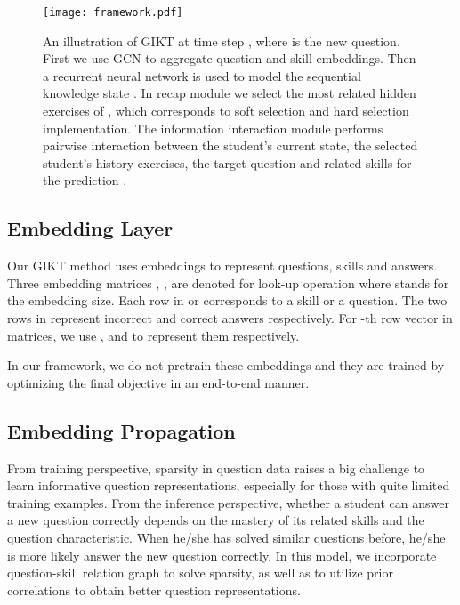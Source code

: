 \documentclass[runningheads]{llncs}
\begin{document}
\begin{figure}
	\texttt{[image: framework.pdf]}
	\caption{An illustration of GIKT at time step , where  is the new question. First we use GCN to aggregate question and skill embeddings. Then a recurrent neural network is used to model the sequential knowledge state . In recap module we select the most related hidden exercises of , which corresponds to soft selection and hard selection implementation. The information interaction module performs pairwise interaction between the student’s current state, the selected student’s history 
		exercises, the target question and related skills for the prediction .} \label{framework}
	\label{fig:framework}
\end{figure}

\subsection{Embedding Layer}

Our GIKT method uses embeddings to represent questions, skills and answers. Three embedding matrices , ,
 are denoted for look-up operation where  stands for the embedding size. Each row in  or   corresponds to a skill or a question. The two rows in  represent incorrect and correct answers respectively. For -th row vector in matrices, we use ,  and  to represent them respectively.

In our framework, we do not pretrain these embeddings and they are trained by optimizing the final objective in an end-to-end manner.


\subsection{Embedding Propagation}



From training perspective, sparsity in question data raises a big challenge to learn informative question representations, especially for those with quite limited training examples. From the inference perspective, whether a student can answer a new question correctly depends on the mastery of its related skills and the question characteristic. When he/she has solved similar questions before, he/she is more likely answer the new question correctly. In this model, we incorporate question-skill relation graph  to solve sparsity, as well as to utilize prior correlations to obtain better question representations.
\end{document}
